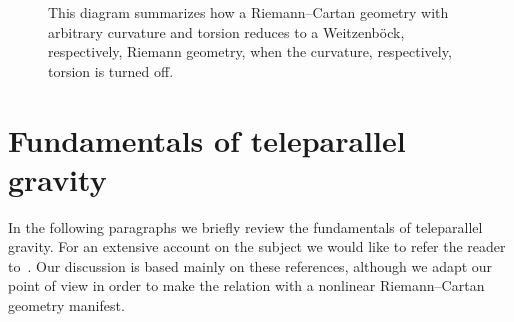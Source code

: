 \documentclass[
final,
11pt,
a4paper,
DIV=11,
headinclude=true,
footinclude=false,
bibliography=totoc,
twoside=true,  %
BCOR=5mm
]{scrbook}
\begin{document}
\begin{figure}
\centering
{}
\caption{This diagram summarizes how a Riemann--Cartan geometry 
  with arbitrary curvature and torsion reduces to 
  a Weitzenb\"ock, respectively, Riemann geometry, when the 
  curvature, respectively, torsion is turned off.}
\label{fig:RCgeo}
\end{figure}


\section{Fundamentals of teleparallel gravity}
\label{sec:FundTeleGr}

In the following paragraphs we briefly review the fundamentals of 
teleparallel gravity. For an extensive account on the subject we 
would like to refer the reader to~\cite{aldrovandi:2012tele, 
  deAndrade:2000sf, Arcos:2005ec}. Our discussion is based mainly 
on these references, although we adapt our point of view in order 
to make the relation with a nonlinear Riemann--Cartan geometry 
manifest.
\end{document}
